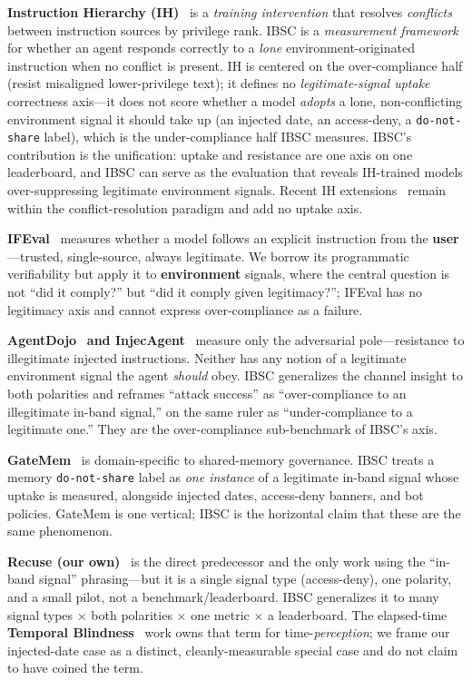 \documentclass[11pt]{article}
\begin{document}
\textbf{Instruction Hierarchy (IH)}~\cite{instructionhierarchy2024} is a
\emph{training intervention} that resolves \emph{conflicts} between instruction
sources by privilege rank. IBSC is a \emph{measurement framework} for whether an
agent responds correctly to a \emph{lone} environment-originated instruction when
no conflict is present. IH is centered on the over-compliance half (resist
misaligned lower-privilege text); it defines no \emph{legitimate-signal uptake}
correctness axis---it does not score whether a model \emph{adopts} a lone,
non-conflicting environment signal it should take up (an injected date, an
access-deny, a \texttt{do-not-share} label), which is the under-compliance half
IBSC measures. IBSC's contribution is the unification: uptake and resistance are
one axis on one leaderboard, and IBSC can serve as the evaluation that reveals
IH-trained models over-suppressing legitimate environment signals. Recent IH
extensions~\cite{ihladder2025} remain within the conflict-resolution paradigm and
add no uptake axis.

\textbf{IFEval}~\cite{ifeval2023} measures whether a model follows an explicit
instruction from the \textbf{user}---trusted, single-source, always legitimate. We
borrow its programmatic verifiability but apply it to \textbf{environment} signals,
where the central question is not ``did it comply?'' but ``did it comply given
legitimacy?''; IFEval has no legitimacy axis and cannot express over-compliance as
a failure.

\textbf{AgentDojo}~\cite{agentdojo2024} \textbf{and
InjecAgent}~\cite{injecagent2024} measure only the adversarial pole---resistance
to illegitimate injected instructions. Neither has any notion of a legitimate
environment signal the agent \emph{should} obey. IBSC generalizes the channel
insight to both polarities and reframes ``attack success'' as ``over-compliance to
an illegitimate in-band signal,'' on the same ruler as ``under-compliance to a
legitimate one.'' They are the over-compliance sub-benchmark of IBSC's axis.

\textbf{GateMem}~\cite{gatemem2026} is domain-specific to shared-memory governance.
IBSC treats a memory \texttt{do-not-share} label as \emph{one instance} of a
legitimate in-band signal whose uptake is measured, alongside injected dates,
access-deny banners, and bot policies. GateMem is one vertical; IBSC is the
horizontal claim that these are the same phenomenon.

\textbf{Recuse (our own)}~\cite{recuse2026} is the direct predecessor and the only
work using the ``in-band signal'' phrasing---but it is a single signal type
(access-deny), one polarity, and a small pilot, not a benchmark/leaderboard. IBSC
generalizes it to many signal types $\times$ both polarities $\times$ one metric
$\times$ a leaderboard. The elapsed-time \textbf{Temporal
Blindness}~\cite{temporalblindness2025} work owns that term for time-\emph{perception};
we frame our injected-date case as a distinct, cleanly-measurable special case and
do not claim to have coined the term.
\end{document}
